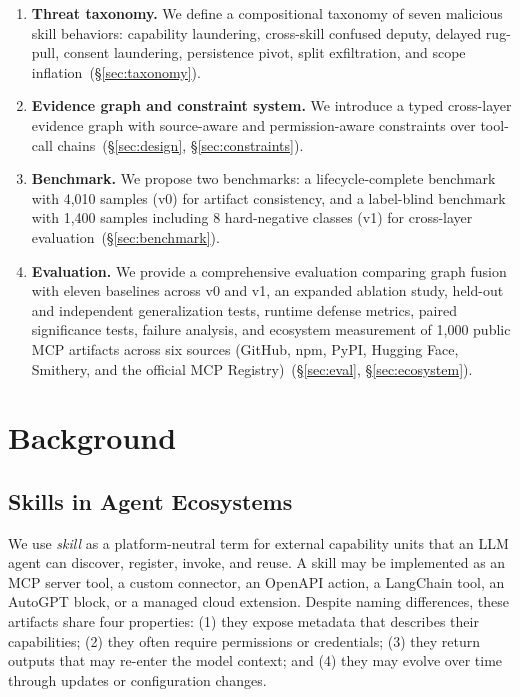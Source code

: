 \documentclass[10pt]{article}
\begin{document}
\begin{enumerate}[leftmargin=*]
\item \textbf{Threat taxonomy.} We define a compositional taxonomy of seven malicious skill behaviors: capability laundering, cross-skill confused deputy, delayed rug-pull, consent laundering, persistence pivot, split exfiltration, and scope inflation~(\S\ref{sec:taxonomy}).
\item \textbf{Evidence graph and constraint system.} We introduce a typed cross-layer evidence graph with source-aware and permission-aware constraints over tool-call chains~(\S\ref{sec:design}, \S\ref{sec:constraints}).
\item \textbf{Benchmark.} We propose two benchmarks: a lifecycle-complete benchmark with 4{,}010 samples (v0) for artifact consistency, and a label-blind benchmark with 1{,}400 samples including 8 hard-negative classes (v1) for cross-layer evaluation~(\S\ref{sec:benchmark}).
\item \textbf{Evaluation.} We provide a comprehensive evaluation comparing graph fusion with eleven baselines across v0 and v1, an expanded ablation study, held-out and independent generalization tests, runtime defense metrics, paired significance tests, failure analysis, and ecosystem measurement of 1{,}000 public MCP artifacts across six sources (GitHub, npm, PyPI, Hugging Face, Smithery, and the official MCP Registry)~(\S\ref{sec:eval}, \S\ref{sec:ecosystem}).
\end{enumerate}

\section{Background}
\label{sec:background}

\subsection{Skills in Agent Ecosystems}

We use \emph{skill} as a platform-neutral term for external capability units that an LLM agent can discover, register, invoke, and reuse. A skill may be implemented as an MCP server tool, a custom connector, an OpenAPI action, a LangChain tool, an AutoGPT block, or a managed cloud extension. Despite naming differences, these artifacts share four properties: (1) they expose metadata that describes their capabilities; (2) they often require permissions or credentials; (3) they return outputs that may re-enter the model context; and (4) they may evolve over time through updates or configuration changes.
\end{document}
